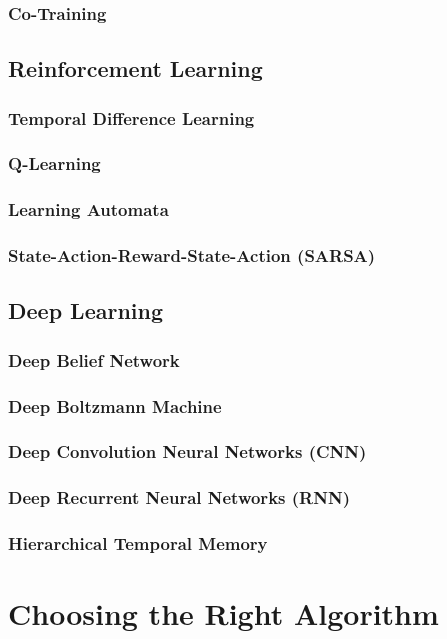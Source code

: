 \documentclass{report}
\begin{document}
	\subsection{Co-Training}

\section{Reinforcement Learning}

	\subsection{Temporal Difference Learning}

	\subsection{Q-Learning}

	\subsection{Learning Automata}

	\subsection{State-Action-Reward-State-Action (SARSA)}

\section{Deep Learning}

	\subsection{Deep Belief Network}

	\subsection{Deep Boltzmann Machine}

	\subsection{Deep Convolution Neural Networks (CNN)}

	\subsection{Deep Recurrent Neural Networks (RNN)}

	\subsection{Hierarchical Temporal Memory}
	
\chapter{Choosing the Right Algorithm}

\begin{thebibliography}

\end{thebibliography}
\end{document}
